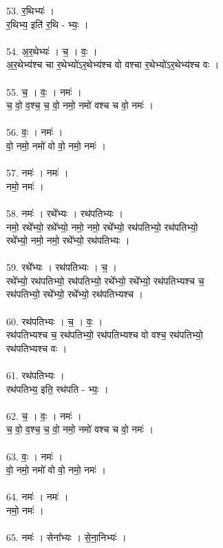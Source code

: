 53. र॒थिभ्यः॑ ।\\
र॒थिभ्य॒ इति॑ र॒थि - भ्यः॒ ।\\
\\
54. अ॒र॒थेभ्यः॑ । च॒ । वः॒ ।\\
अ॒र॒थेभ्य॑श्च चा र॒थेभ्यो॑ऽर॒थेभ्य॑श्च वो वश्चा र॒थेभ्यो॑ऽर॒थेभ्य॑श्च वः ।\\
\\
55. च॒ । वः॒ । नमः॑ ।\\
च॒ वो॒ व॒श्च॒ च॒ वो॒ नमो॒ नमो॑ वश्च च वो॒ नमः॑ ।\\
\\
56. वः॒ । नमः॑ ।\\
वो॒ नमो॒ नमो॑ वो वो॒ नमो॒ नमः॑ ।\\
\\
57. नमः॑ । नमः॑ ।\\
नमो॒ नमः॑ ।\\
\\
58. नमः॑ । रथे᳚भ्यः । रथ॑पतिभ्यः ।\\
नमो॒ रथे᳚भ्यो॒ रथे᳚भ्यो॒ नमो॒ नमो॒ रथे᳚भ्यो॒ रथ॑पतिभ्यो॒ रथ॑पतिभ्यो॒\\
रथे᳚भ्यो॒ नमो॒ नमो॒ रथे᳚भ्यो॒ रथ॑पतिभ्यः ।\\
\\
59. रथे᳚भ्यः । रथ॑पतिभ्यः । च॒ ।\\
रथे᳚भ्यो॒ रथ॑पतिभ्यो॒ रथ॑पतिभ्यो॒ रथे᳚भ्यो॒ रथे᳚भ्यो॒ रथ॑पतिभ्यश्च च॒\\
रथ॑पतिभ्यो॒ रथे᳚भ्यो॒ रथे᳚भ्यो॒ रथ॑पतिभ्यश्च ।\\
\\
60. रथ॑पतिभ्यः । च॒ । वः॒ ।\\
रथ॑पतिभ्यश्च च॒ रथ॑पतिभ्यो॒ रथ॑पतिभ्यश्च वो वश्च॒ रथ॑पतिभ्यो॒\\
रथ॑पतिभ्यश्च वः ।\\
\\
61. रथ॑पतिभ्यः ।\\
रथ॑पतिभ्य॒ इति॒ रथ॑पति - भ्यः॒ ।\\
\\
62. च॒ । वः॒ । नमः॑ ।\\
च॒ वो॒ व॒श्च॒ च॒ वो॒ नमो॒ नमो॑ वश्च च वो॒ नमः॑ ।\\
\\
63. वः॒ । नमः॑ ।\\
वो॒ नमो॒ नमो॑ वो वो॒ नमो॒ नमः॑ ।\\
\\
64. नमः॑ । नमः॑ ।\\
नमो॒ नमः॑ ।\\
\\
65. नमः॑ । सेना᳚भ्यः । से॒ना॒निभ्यः॑ ।\\

